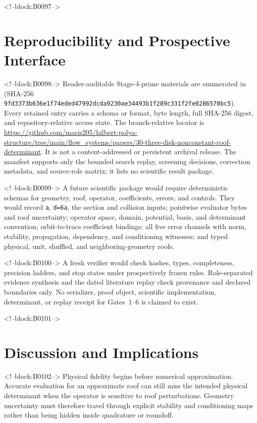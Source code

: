 \documentclass[11pt,a4paper]{article}
\begin{document}
<!--block:B0097-->
\section{Reproducibility and Prospective Interface}

<!--block:B0098-->
Reader-auditable Stage-4-prime materials are enumerated in
 (SHA-256
\texttt{9fd3373b636e1f74\allowbreak eded47992dcda923\allowbreak 0ae34493b1f289c3\allowbreak 31f2fe0286570bc5}).  Every retained entry carries a schema or format,
byte length, full SHA-256 digest, and repository-relative access state.  The
branch-relative locator is
\url{https://github.com/maris205/hilbert-polya-structure/tree/main/flow_systems/papers/30-three-disk-nonconstant-roof-determinant}.
It is not a content-addressed or persistent archival release.  The manifest
supports only the bounded search replay, screening decisions, correction
metadata, and source-role matrix; it lists no scientific result package.

<!--block:B0099-->
A future scientific package would require deterministic schemas for geometry, roof, operator, coefficients, errors, and controls. They would record \texttt{a}, \texttt{d=6a}, the section and collision inputs; pointwise evaluator bytes and roof uncertainty; operator space, domain, potential, basis, and determinant convention; orbit-to-trace coefficient bindings; all five error channels with norm, stability, propagation, dependency, and conditioning witnesses; and typed physical, unit, shuffled, and neighboring-geometry roofs.

<!--block:B0100-->
A fresh verifier would check hashes, types, completeness, precision ladders,
and stop states under prospectively frozen rules.  Role-separated evidence
synthesis and the dated literature replay check provenance and declared
boundaries only.  No serializer, proof object, scientific implementation,
determinant, or replay receipt for Gates~1--6 is claimed to exist.

<!--block:B0101-->
\section{Discussion and Implications}

<!--block:B0102-->
Physical fidelity begins before numerical approximation. Accurate evaluation for an approximate roof can still miss the intended physical determinant when the operator is sensitive to roof perturbations. Geometry uncertainty must therefore travel through explicit stability and conditioning maps rather than being hidden inside quadrature or roundoff.
\end{document}
